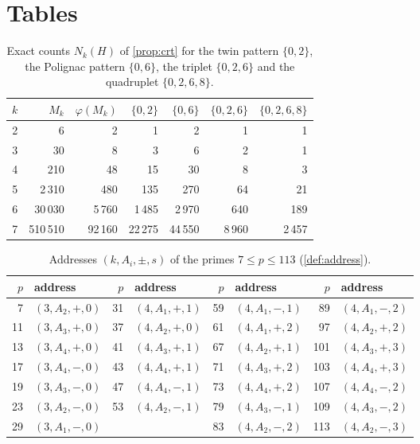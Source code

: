\documentclass[11pt,a4paper]{article}
\theoremstyle{plain}
\theoremstyle{definition}
\theoremstyle{remark}
\begin{document}
\section{Tables}\label{app:tables}
\begin{table}[H]
\centering\small
\caption{Exact counts $N_k(H)$ of \cref{prop:crt} for the twin pattern
$\{0,2\}$, the Polignac pattern $\{0,6\}$, the triplet $\{0,2,6\}$ and the
quadruplet $\{0,2,6,8\}$.}
\label{tab:counts}
\begin{tabular}{rrrrrrr}\toprule
$k$ & $M_k$ & $\varphi(M_k)$ & $\{0,2\}$ & $\{0,6\}$ & $\{0,2,6\}$ & $\{0,2,6,8\}$\\\midrule
2 & 6 & 2 & 1 & 2 & 1 & 1\\
3 & 30 & 8 & 3 & 6 & 2 & 1\\
4 & 210 & 48 & 15 & 30 & 8 & 3\\
5 & 2\,310 & 480 & 135 & 270 & 64 & 21\\
6 & 30\,030 & 5\,760 & 1\,485 & 2\,970 & 640 & 189\\
7 & 510\,510 & 92\,160 & 22\,275 & 44\,550 & 8\,960 & 2\,457\\\bottomrule
\end{tabular}
\end{table}

\begin{table}[H]
\centering\small
\caption{Addresses $(k,A_i,\pm,s)$ of the primes $7\le p\le113$
(\cref{def:address}).}
\label{tab:addresses}
\begin{tabular}{rl@{\qquad}rl@{\qquad}rl@{\qquad}rl}\toprule
$p$ & address & $p$ & address & $p$ & address & $p$ & address\\\midrule
7 & $(3,A_2,+,0)$ & 31 & $(4,A_1,+,1)$ & 59 & $(4,A_1,-,1)$ & 89 & $(4,A_1,-,2)$\\
11 & $(3,A_3,+,0)$ & 37 & $(4,A_2,+,0)$ & 61 & $(4,A_1,+,2)$ & 97 & $(4,A_2,+,2)$\\
13 & $(3,A_4,+,0)$ & 41 & $(4,A_3,+,1)$ & 67 & $(4,A_2,+,1)$ & 101 & $(4,A_3,+,3)$\\
17 & $(3,A_4,-,0)$ & 43 & $(4,A_4,+,1)$ & 71 & $(4,A_3,+,2)$ & 103 & $(4,A_4,+,3)$\\
19 & $(3,A_3,-,0)$ & 47 & $(4,A_4,-,1)$ & 73 & $(4,A_4,+,2)$ & 107 & $(4,A_4,-,2)$\\
23 & $(3,A_2,-,0)$ & 53 & $(4,A_2,-,1)$ & 79 & $(4,A_3,-,1)$ & 109 & $(4,A_3,-,2)$\\
29 & $(3,A_1,-,0)$ &    &               & 83 & $(4,A_2,-,2)$ & 113 & $(4,A_2,-,3)$\\\bottomrule
\end{tabular}
\end{table}
\end{document}
